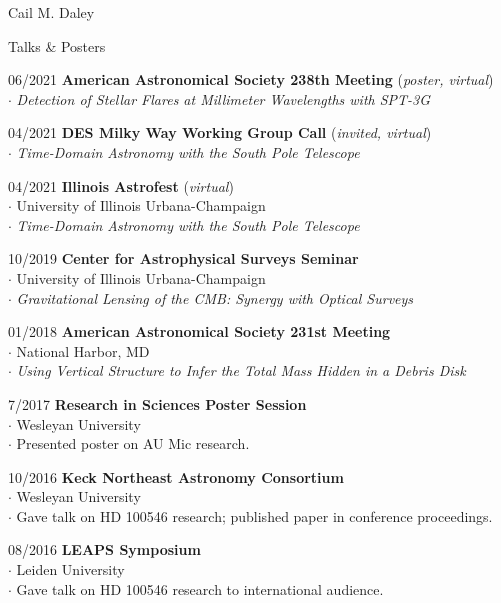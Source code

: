 \documentclass[11pt,a4paper]{article}
\begin{document}
\begin{cv}{Cail M. Daley}
\begin{cvlist}{Talks \& Posters}
  \item [06/2021]
    \textbf{American Astronomical Society 238th Meeting} (\textit{poster, virtual}) \\
    $\cdot$ \textit{Detection of Stellar Flares at Millimeter Wavelengths with SPT-3G}

  \item [04/2021]
    \textbf{DES Milky Way Working Group Call} (\textit{invited, virtual}) \\
    $\cdot$ \textit{Time-Domain Astronomy with the South Pole Telescope}

  \item [04/2021]
    \textbf{Illinois Astrofest} (\textit{virtual}) \\
    $\cdot$ University of Illinois Urbana-Champaign \\
    $\cdot$ \textit{Time-Domain Astronomy with the South Pole Telescope}

  \item [10/2019]
    \textbf{Center for Astrophysical Surveys Seminar} \\
    $\cdot$ University of Illinois Urbana-Champaign \\
    $\cdot$ \textit{Gravitational Lensing of the CMB: Synergy with Optical Surveys}

  \item[01/2018]
    \textbf{American Astronomical Society 231st Meeting}\\
    $\cdot$ National Harbor, MD\\
    $\cdot$ \textit{Using Vertical Structure to Infer the Total
    Mass Hidden in a Debris Disk}

  \item[7/2017]
    \textbf{Research in Sciences Poster Session}\\
    $\cdot$ Wesleyan University\\
    $\cdot$ Presented poster on AU Mic research.

  \item[10/2016]
    \textbf{Keck Northeast Astronomy Consortium}\\
    $\cdot$ Wesleyan University\\
    $\cdot$ Gave talk on HD 100546 research; published paper in conference proceedings.

  \item[08/2016]
    \textbf{LEAPS Symposium} \\
    $\cdot$ Leiden University \\
    $\cdot$ Gave talk on HD 100546 research to international audience.


\end{cvlist}
\end{cv}
\end{document}
